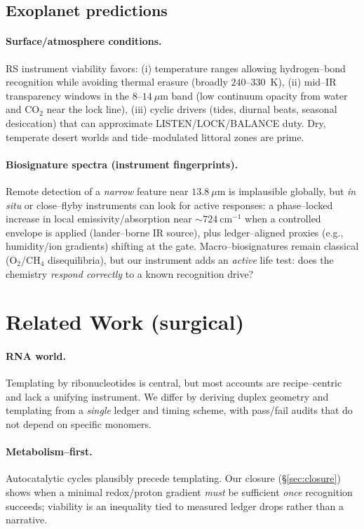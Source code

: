 \documentclass[11pt]{article}
\begin{document}
\subsection{Exoplanet predictions}\label{sec:exo}
\paragraph{Surface/atmosphere conditions.}
RS instrument viability favors: (i) temperature ranges allowing hydrogen–bond recognition while avoiding thermal erasure (broadly $240$–$330$~K), (ii) mid–IR transparency windows in the $8$–$14~\mu$m band (low continuum opacity from water and CO$_2$ near the lock line), (iii) cyclic drivers (tides, diurnal beats, seasonal desiccation) that can approximate LISTEN/LOCK/BALANCE duty. Dry, temperate desert worlds and tide–modulated littoral zones are prime.

\paragraph{Biosignature spectra (instrument fingerprints).}
Remote detection of a \emph{narrow} feature near $13.8~\mu$m is implausible globally, but \emph{in situ} or close–flyby instruments can look for active responses: a phase–locked increase in local emissivity/absorption near $\sim 724~\mathrm{cm^{-1}}$ when a controlled envelope is applied (lander–borne IR source), plus ledger–aligned proxies (e.g., humidity/ion gradients) shifting at the gate. Macro–biosignatures remain classical (O$_2$/CH$_4$ disequilibria), but our instrument adds an \emph{active} life test: does the chemistry \emph{respond correctly} to a known recognition drive?

\section{Related Work (surgical)}\label{sec:related-works}
\paragraph{RNA world.}
Templating by ribonucleotides is central, but most accounts are recipe–centric and lack a unifying instrument. We differ by deriving duplex geometry and templating from a \emph{single} ledger and timing scheme, with pass/fail audits that do not depend on specific monomers.

\paragraph{Metabolism–first.}
Autocatalytic cycles plausibly precede templating. Our closure (\S\ref{sec:closure}) shows when a minimal redox/proton gradient \emph{must} be sufficient \emph{once} recognition succeeds; viability is an inequality tied to measured ledger drops rather than a narrative.
\end{document}

